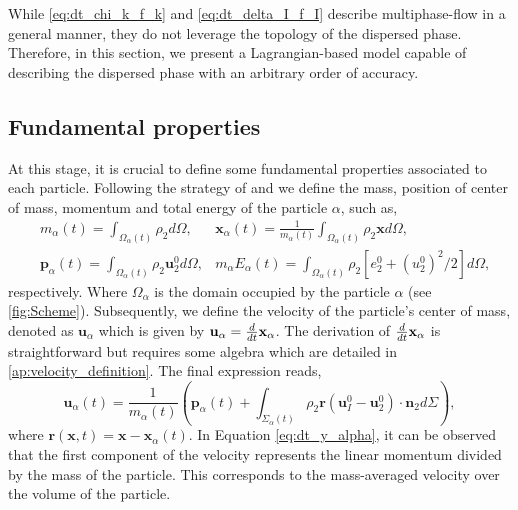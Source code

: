 
While \ref{eq:dt_chi_k_f_k} and \ref{eq:dt_delta_I_f_I} describe multiphase-flow in a general manner, they do not leverage the topology of the dispersed phase. 
Therefore, in this section, we present a Lagrangian-based model capable of describing the dispersed phase with an arbitrary order of accuracy.

\subsection{Fundamental properties}

At this stage, it is crucial to define some fundamental properties associated to each particle.
Following the strategy of \citet{lhuillier2009rheology,lhuillier1992volume,zaepffel2011modelisation} and \citet[Chapter 2]{morel2015mathematical}
we define the mass, position of center of mass, momentum and total energy of the particle $\alpha$, such as,
\begin{align}
    &m_\alpha(t)
    = \int_{\Omega_\alpha(t)} \rho_2  d\Omega,
    &\textbf{x}_\alpha(t)
    = \frac{1}{m_\alpha(t) }\int_{\Omega_\alpha(t)} \rho_2 \textbf{x} d\Omega,\\
    &\textbf{p}_\alpha(t) 
    = \int_{\Omega_\alpha(t)} \rho_2 \textbf{u}_2^0 d\Omega,
    & m_\alpha E_\alpha(t) 
    = \int_{\Omega_\alpha(t)} \rho_2 [e_2^0 + (u_2^0)^2/2] d\Omega,
    \label{eq:position_and_momentum_def}
\end{align}
respectively. 
Where $\Omega_\alpha$ is the domain occupied by the particle $\alpha$ (see \ref{fig:Scheme}). 
Subsequently, we define the velocity of the particle's center of mass, denoted as $\textbf{u}_\alpha$ which is given by $\textbf{u}_\alpha = \frac{d}{d t}{ \textbf{x}_\alpha}$. 
The derivation of $\frac{d}{d t} {\textbf{x}_\alpha}$ is straightforward but requires some algebra which are detailed in \ref{ap:velocity_definition}. 
The final expression reads,
\begin{equation}
    \textbf{u}_\alpha(t) = \frac{1}{m_\alpha(t)} \left(
        \textbf{p}_\alpha(t)
        +  \int_{\Sigma_\alpha(t)} \rho_2 \textbf{r} (\textbf{u}_I^0 - \textbf{u}_2^0)\cdot \textbf{n}_2 d\Sigma
        \right),
        \label{eq:dt_y_alpha}
\end{equation}
where $\textbf{r}(\textbf{x},t) = \textbf{x} - \textbf{x}_\alpha(t)$. 
In Equation \ref{eq:dt_y_alpha}, it can be observed that the first component of the velocity represents the linear momentum divided by the mass of the particle. 
This corresponds to the mass-averaged velocity over the volume of the particle.
